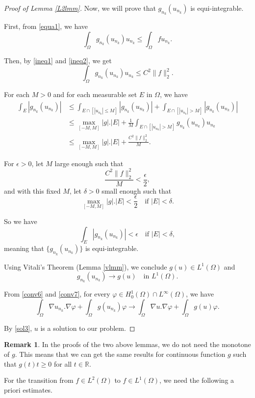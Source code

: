 \documentclass[a4paper, 11pt]{report}
\theoremstyle{definition}\newtheorem*{rmk}{Remark}
\begin{document}
\begin{proof}[Proof of Lemma \ref{L2lmm}]
Now, we will prove that $g_{n_k}(u_{n_k})$ is equi-integrable.

First, from \eqref{equa1}, we have
\[
\int_{\Omega} g_{n_k}(u_{n_k})u_{n_k} \le \int_{\Omega} f u_{n_k}.
\]

Then, by \eqref{ineq1} and \eqref{ineq2}, we get
\[
\int_{\Omega} g_{n_k}(u_{n_k})u_{n_k} \le C^2\| f\|^2_{2}.
\]

For each $M > 0$ and for each measurable set $E$ in $\Omega$, we have
\begin{align*}
\int_E |g_{n_k}(u_{n_k})|& \le \int_{E\cap [|u_{n_k}| \le M]} |g_{n_k}(u_{n_k})| + \int_{E\cap[|u_{n_k}| > M]} |g_{n_k}(u_{n_k})|\\
&\le \max_{[-M,M]} |g|.|E| + \frac{1}{M}\int_{E\cap[|u_{n_k}| > M]} g_{n_k}(u_{n_k})u_{n_k}\\
&\le \max_{[-M,M]} |g|.|E| + \frac{C^2\| f\|^2_2}{M}.
\end{align*}

For $\epsilon > 0$, let $M$ large enough such that
\[
\frac{C^2\| f\|^2_{2}}{M} < \frac{\epsilon}{2},
\]
and with this fixed $M$, let $\delta > 0$ small enough such that
\[
\max_{[-M,M]} |g|.|E| < \frac{\epsilon}{2}\quad \text{if } |E| < \delta.
\]

So we have
\[
\int_E|g_{n_k}(u_{n_k})| < \epsilon \quad \text{if } |E|<\delta ,
\]
meaning that $\{g_{n_k}(u_{n_k})\}$ is equi-integrable.

Using Vitali's Theorem (Lemma \ref{vlmm}), we conclude $g(u)\in L^1(\Omega)$ and
\begin{equation}\label{conv7}
g_{n_k}(u_{n_k})\to g(u)\quad \text{in } L^1(\Omega).
\end{equation}

From \eqref{conv6} and \eqref{conv7}, for every $\varphi \in H^1_0(\Omega)\cap L^{\infty}(\Omega)$, we have
\[
\int_{\Omega}\nabla u_{n_k} . \nabla \varphi + \int_{\Omega}g(u_{n_k})\varphi \to \int_{\Omega}\nabla u . \nabla \varphi + \int_{\Omega}g(u)\varphi.
\]

By \eqref{sol3}, $u$ is a solution to our problem.
\end{proof}

\begin{rmk}
In the proofs of the two above lemmas, we do not need the monotone of $g$. This means that we can get the same results for continuous function $g$ such that $g(t)t \ge 0$ for all $ t\in \mathbb{R}$.
\end{rmk}

For the transition from $f\in L^2(\Omega)$ to $f\in L^1(\Omega)$, we need the following a priori estimates.
\end{document}
